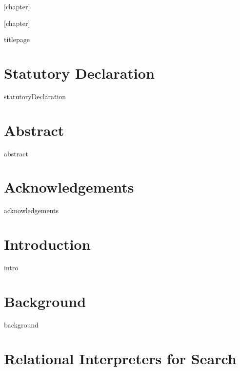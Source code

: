\documentclass[11pt,a4paper]{book}
\begin{document}
[chapter]

[chapter]

\frontmatter
{titlepage}

\linespread{1.2}\selectfont

\chapter*{Statutory Declaration}
{statutoryDeclaration}


\chapter*{Abstract}
{abstract}

\chapter*{Acknowledgements}
{acknowledgements}

\dominitoc
\tableofcontents


\mainmatter

\chapter{Introduction}\label{chap:intro}
{intro}

\chapter{Background}\label{chap:background}
{background}

\chapter{Relational Interpreters for Search}\label{chap:1}

\end{document}
